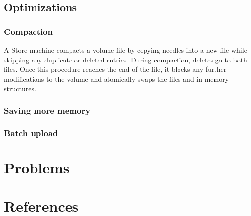 \documentclass[11pt]{article}
\begin{document}
\subsection{Optimizations}
\label{sec:org1317fef}
\subsubsection{Compaction}
\label{sec:org2b3859a}
A Store machine compacts a volume file by copying needles into a new file while skipping any duplicate
or deleted entries. During compaction, deletes go to both files. Once this procedure reaches the end
of the file, it blocks any further modifications to the volume and atomically swaps the files and
in-memory structures.
\subsubsection{Saving more memory}
\label{sec:orgdebbaa0}
\subsubsection{Batch upload}
\label{sec:org746bc21}
\section{Problems}
\label{sec:org73cb39a}


\section{References}
\label{sec:org747dfd5}
\label{bibliographystyle link}



\end{document}
